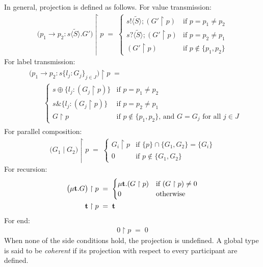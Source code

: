 \documentclass[a4paper,12pt,oneside,fleqn]{book} %
\begin{document}
In general,
  projection is defined as follows.
For value transmission:
\begin{align}
\bigl(p_1\to p_2: s\langle\tilde{S}\rangle.G'\bigr)\upharpoonright p
  \;=\;
  \begin{cases}
    s!\langle\tilde{S}\rangle; (G' \upharpoonright p)
      &\text{if $p=p_1\ne p_2$} \\
    s?\langle\tilde{S}\rangle; (G' \upharpoonright p)
      &\text{if $p=p_2\ne p_1$} \\
    (G' \upharpoonright p)
      &\text{if $p\notin\{p_1,p_2\}$}
  \end{cases}
\end{align}
For label transmission:
\begin{align}
\begin{aligned}
&\bigl(p_1\to p_2: s\{l_j:G_j\}_{j\in J}\bigr)\upharpoonright p
  \;=\;\\
&\qquad
  \begin{cases}
    s\oplus \bigl\{l_j:(G_j \upharpoonright p)\bigr\}
      &\text{if $p=p_1\ne p_2$} \\
    s\& \bigl\{l_j:(G_j \upharpoonright p)\bigr\}
      &\text{if $p=p_2\ne p_1$} \\
    G \upharpoonright p
      &\text{if $p\notin\{p_1,p_2\}$, and $G=G_j$ for all $j\in J$}
  \end{cases}
\end{aligned}
\end{align}
For parallel composition:
\begin{align}
\bigl(G_1\mid G_2\bigr) \upharpoonright p \;=\;
  \begin{cases}
  G_i \upharpoonright p
    &\text{if $\{p\}\cap\{G_1,G_2\}=\{G_i\}$} \\
  0 &\text{if $p\notin\{G_1,G_2\}$}
  \end{cases}
\end{align}
For recursion:
\begin{align}
\bigl(\mu{\bf t}.G\bigr)\upharpoonright p
  \;&=\;
  \begin{cases}
  \mu{\bf t}.(G\upharpoonright p)
    &\text{if $(G\upharpoonright p)\ne0$} \\
  0 &\text{otherwise}
  \end{cases}
\\
{\bf t}\upharpoonright p \;&=\;
  {\bf t}
\end{align}
For end:
\begin{align}
  0\upharpoonright p \;=\; 0
\end{align}
When none of the side conditions hold,
  the projection is undefined.
A global type is said to be \emph{coherent}
  if its projection with respect to every participant are defined.
\end{document}
